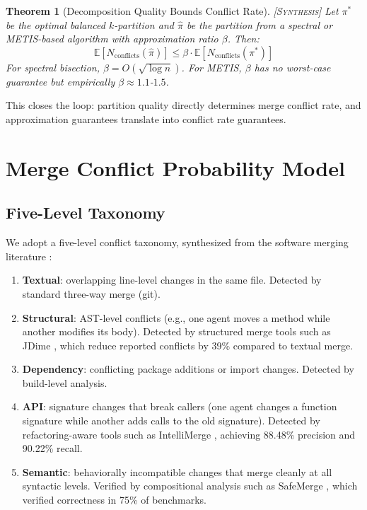 \documentclass[11pt]{article}
\newtheorem{theorem}{Theorem}[section]
\theoremstyle{definition}
\theoremstyle{remark}
\newcommand{\synthesis}{\textsc{[Synthesis]}}
\begin{document}
\begin{theorem}[Decomposition Quality Bounds Conflict Rate] \synthesis{}
\label{thm:decomp-quality}
Let $\pi^*$ be the optimal balanced $k$-partition and $\hat{\pi}$ be the partition from a spectral or METIS-based algorithm with approximation ratio $\beta$.
Then:
\begin{equation}
  \mathbb{E}[N_{\mathrm{conflicts}}(\hat{\pi})] \leq \beta \cdot \mathbb{E}[N_{\mathrm{conflicts}}(\pi^*)]
\end{equation}
For spectral bisection, $\beta = O(\sqrt{\log n})$.
For METIS, $\beta$ has no worst-case guarantee but empirically $\beta \approx 1.1$-$1.5$.
\end{theorem}

This closes the loop: partition quality directly determines merge conflict rate, and approximation guarantees translate into conflict rate guarantees.


\section{Merge Conflict Probability Model}
\label{sec:merge}

\subsection{Five-Level Taxonomy}

We adopt a five-level conflict taxonomy, synthesized from the software merging literature \citep{Accioly2018, Sousa2018, Falleri2014, Apel2012}:

\begin{enumerate}[nosep]
  \item \textbf{Textual}: overlapping line-level changes in the same file. Detected by standard three-way merge (git).
  \item \textbf{Structural}: AST-level conflicts (e.g., one agent moves a method while another modifies its body). Detected by structured merge tools such as JDime \citep{Apel2012}, which reduce reported conflicts by 39\% compared to textual merge.
  \item \textbf{Dependency}: conflicting package additions or import changes. Detected by build-level analysis.
  \item \textbf{API}: signature changes that break callers (one agent changes a function signature while another adds calls to the old signature). Detected by refactoring-aware tools such as IntelliMerge \citep{Shen2019}, achieving 88.48\% precision and 90.22\% recall.
  \item \textbf{Semantic}: behaviorally incompatible changes that merge cleanly at all syntactic levels. Verified by compositional analysis such as SafeMerge \citep{Sousa2018}, which verified correctness in 75\% of benchmarks.
\end{enumerate}
\end{document}

